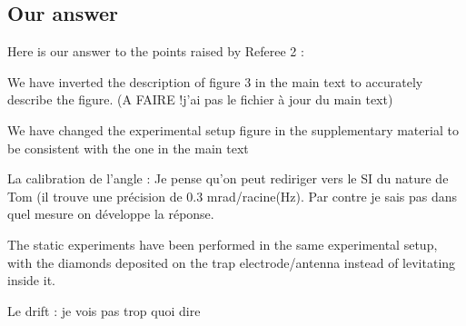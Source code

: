 \documentclass{article}
\begin{document}
\subsection*{Our answer}
Here is our answer to the points raised by Referee 2 :

We have inverted the description of figure 3 in the main text to accurately describe the figure. (A FAIRE !j'ai pas le fichier à jour du main text)

We have changed the experimental setup figure in the supplementary material to be consistent with the one in the main text

La calibration de l'angle : Je pense qu'on peut rediriger vers le SI du nature de Tom (il trouve une précision de 0.3 mrad/racine(Hz). Par contre je sais pas dans quel mesure on développe la réponse.

The static experiments have been performed in the same experimental setup, with the diamonds deposited on the trap electrode/antenna instead of levitating inside it.

Le drift : je vois pas trop quoi dire
\end{document}
